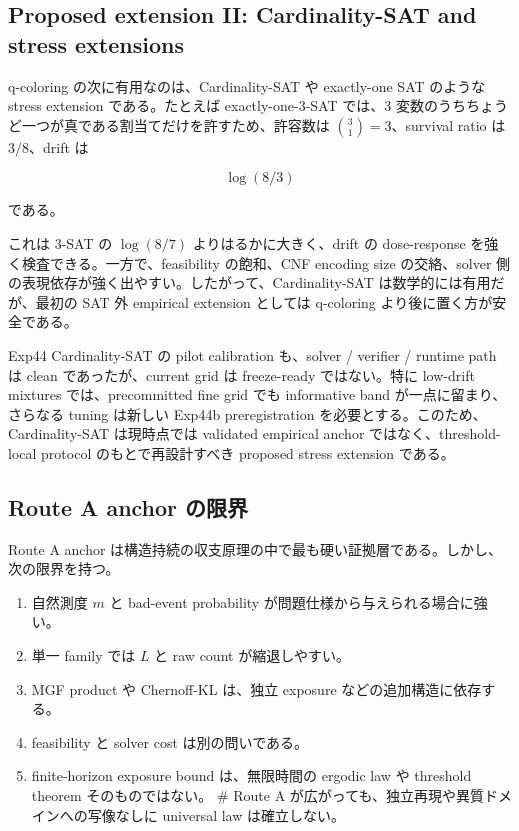 \documentclass[12pt,a4paper]{article}
\begin{document}
\subsection{Proposed extension II: Cardinality-SAT and stress extensions}\label{proposed-extension-ii-cardinality-sat-and-stress-extensions}

q-coloring の次に有用なのは、Cardinality-SAT や exactly-one SAT のような stress extension である。たとえば exactly-one-3-SAT では、3 変数のうちちょうど一つが真である割当てだけを許すため、許容数は \(\binom{3}{1}=3\)、survival ratio は \(3/8\)、drift は

\[
\log(8/3)
\]

である。

これは 3-SAT の \(\log(8/7)\) よりはるかに大きく、drift の dose-response を強く検査できる。一方で、feasibility の飽和、CNF encoding size の交絡、solver 側の表現依存が強く出やすい。したがって、Cardinality-SAT は数学的には有用だが、最初の SAT 外 empirical extension としては q-coloring より後に置く方が安全である。

Exp44 Cardinality-SAT の pilot calibration も、solver / verifier / runtime path は clean であったが、current grid は freeze-ready ではない。特に low-drift mixtures では、precommitted fine grid でも informative band が一点に留まり、さらなる tuning は新しい Exp44b preregistration を必要とする。このため、Cardinality-SAT は現時点では validated empirical anchor ではなく、threshold-local protocol のもとで再設計すべき proposed stress extension である。

\subsection{Route A anchor の限界}\label{route-a-anchor-ux306eux9650ux754c}

Route A anchor は構造持続の収支原理の中で最も硬い証拠層である。しかし、次の限界を持つ。

\begin{enumerate}
\def\labelenumi{\arabic{enumi}.}
\tightlist
\item
  自然測度 \(m\) と bad-event probability が問題仕様から与えられる場合に強い。
\item
  単一 family では \(L\) と raw count が縮退しやすい。
\item
  MGF product や Chernoff-KL は、独立 exposure などの追加構造に依存する。
\item
  feasibility と solver cost は別の問いである。
\item
  finite-horizon exposure bound は、無限時間の ergodic law や threshold theorem そのものではない。 \# Route A が広がっても、独立再現や異質ドメインへの写像なしに universal law は確立しない。
\end{enumerate}
\end{document}
